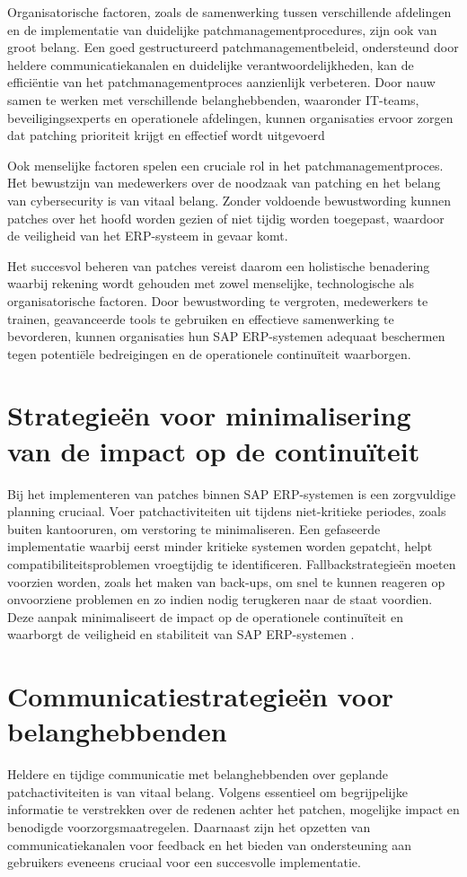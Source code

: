 Organisatorische factoren, zoals de samenwerking tussen verschillende afdelingen en de implementatie van duidelijke patchmanagementprocedures, zijn ook van groot belang. Een goed gestructureerd patchmanagementbeleid, ondersteund door heldere communicatiekanalen en 
duidelijke verantwoordelijkheden, kan de efficiëntie van het patchmanagementproces aanzienlijk verbeteren. Door nauw samen te werken met verschillende belanghebbenden, waaronder IT-teams, beveiligingsexperts en operationele afdelingen, kunnen organisaties ervoor 
zorgen dat patching prioriteit krijgt en effectief wordt uitgevoerd​ \autocite{Maditinos_2011}

Ook menselijke factoren spelen een cruciale rol in het patchmanagementproces. Het bewustzijn van medewerkers over de noodzaak van patching en het belang van cybersecurity
is van vitaal belang. Zonder voldoende bewustwording kunnen patches over het hoofd worden gezien of niet tijdig worden toegepast, waardoor de veiligheid van het ERP-systeem in gevaar komt.

Het succesvol beheren van patches vereist daarom een holistische benadering waarbij rekening wordt gehouden met zowel menselijke, technologische als organisatorische factoren.
Door bewustwording te vergroten, medewerkers te trainen, geavanceerde tools te gebruiken en effectieve samenwerking te bevorderen, 
kunnen organisaties hun SAP ERP-systemen adequaat beschermen tegen potentiële bedreigingen en de operationele continuïteit waarborgen.

\section{Strategieën voor minimalisering van de impact op de continuïteit}
Bij het implementeren van patches binnen SAP ERP-systemen is een zorgvuldige planning cruciaal. Voer patchactiviteiten uit tijdens niet-kritieke periodes, zoals buiten kantooruren, om verstoring te minimaliseren. Een gefaseerde implementatie waarbij eerst minder kritieke systemen worden gepatcht, helpt
 compatibiliteitsproblemen vroegtijdig te identificeren. Fallbackstrategieën moeten voorzien worden, zoals het maken van back-ups, om snel te kunnen reageren op onvoorziene problemen en zo indien nodig terugkeren naar de staat voordien. Deze aanpak minimaliseert de impact op de operationele continuïteit en waarborgt de veiligheid en stabiliteit van SAP ERP-systemen \autocite{Shein2022}.

\section{Communicatiestrategieën voor belanghebbenden}
Heldere en tijdige communicatie met belanghebbenden over geplande patchactiviteiten is van vitaal belang. Volgens \textcite{Toren2019} essentieel om begrijpelijke informatie te verstrekken over de redenen achter het patchen,
mogelijke impact en benodigde voorzorgsmaatregelen. Daarnaast zijn het opzetten van communicatiekanalen voor feedback en het bieden van ondersteuning aan gebruikers eveneens cruciaal voor een succesvolle implementatie.


